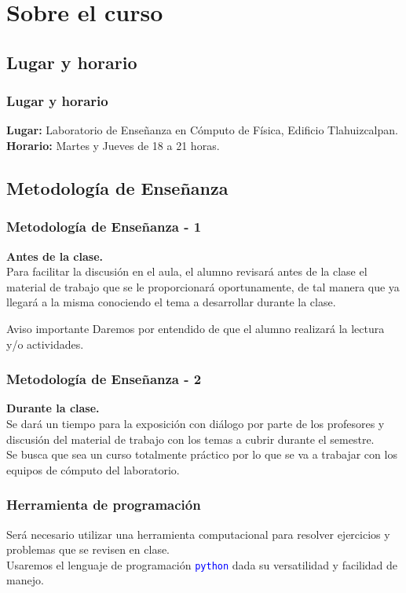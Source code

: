 \documentclass[12pt]{beamer}
\newcommand{\python}{\texttt{python}}
\newcommand{\textoazul}[1]{\textcolor{blue}{#1}}
\begin{document}
\section{Sobre el curso}
\subsection{Lugar y horario}
\begin{frame}
\frametitle{Lugar y horario} 
\textbf{Lugar: }Laboratorio de Enseñanza en Cómputo de Física, Edificio Tlahuizcalpan.
\\
\bigskip
\textbf{Horario: } Martes y Jueves de 18 a 21 horas.
\end{frame}
\subsection{Metodología de Enseñanza}
\begin{frame}
\frametitle{Metodología de Enseñanza - 1}
\textbf{Antes de la clase.}
\\
\medskip
Para facilitar la discusión en el aula, el alumno revisará antes de la clase el material de trabajo que se le proporcionará oportunamente, de tal manera que ya llegará a la misma conociendo el tema a desarrollar durante la clase.
\\
\bigskip
\pause
\begin{alertblock}{Aviso importante}
Daremos por entendido de que el alumno realizará la lectura y/o actividades.
\end{alertblock}
\end{frame}
\begin{frame} 
\frametitle{Metodología de Enseñanza - 2}
\textbf{Durante la clase.}
\\
\medskip
Se dará un tiempo para la exposición con diálogo por parte de los profesores y discusión del material de trabajo con los temas a cubrir durante el semestre.
\\
\bigskip
Se busca que sea un curso totalmente práctico por lo que se va a trabajar con los equipos de cómputo del laboratorio.
\end{frame}
\begin{frame}
\frametitle{Herramienta de programación}
Será necesario utilizar una herramienta computacional para resolver ejercicios y problemas que se revisen en clase.
\\
\bigskip
Usaremos el lenguaje de programación \textoazul{\python} dada su versatilidad y facilidad de manejo.
\end{frame}
\end{document}
